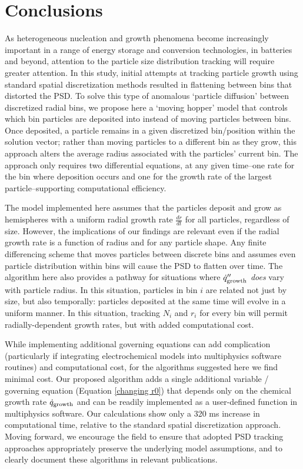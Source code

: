 \documentclass[final,3p,times,twocolumn, 12pt]{elsarticle}
\begin{document}
\section{Conclusions}
 As heterogeneous nucleation and growth phenomena become increasingly important in a range of energy storage and conversion technologies, in batteries and beyond, attention to the particle size distribution tracking will require greater attention. In this study, initial attempts at tracking particle growth using standard spatial discretization methods resulted in flattening between bins that distorted the PSD. To solve this type of anomalous `particle diffusion' between discretized radial bins, we propose here a `moving hopper' model that controls which bin particles are deposited into instead of moving particles between bins. Once deposited, a particle remains in a given discretized bin/position within the solution vector; rather than moving particles to a different bin as they grow, this approach alters the average radius associated with the particles' current bin. The approach only requires two differential equations, at any given time--one rate for the bin where deposition occurs and one for the growth rate of the largest particle--supporting computational efficiency.
 
 The model implemented here assumes that the particles deposit and grow as hemispheres with a uniform radial growth rate $\frac{dr}{dt}$ for all particles, regardless of size. However, the implications of our findings are relevant even if the radial growth rate is a function of radius and for any particle shape. Any finite differencing scheme that moves particles between discrete bins and assumes even particle distribution within bins will cause the PSD to flatten over time.  The algorithm here also provides a pathway for situations where $\dot{q}^{\prime\prime}_{\rm growth}$ \emph{does} vary with particle radius. In this situation, particles in bin $i$ are related not just by size, but also temporally: particles deposited at the same time will evolve in a uniform manner.  In this situation, tracking $N_i$ and $r_i$ for every bin will permit radially-dependent growth rates, but with added computational cost. 

While implementing additional governing equations can add complication (particularly if integrating electrochemical models into multiphysics software routines) and computational cost, for the algorithms suggested here we find minimal cost. Our proposed algorithm adds a single additional variable / governing equation (Equation \ref{changing r0}) that depends only on the chemical growth rate $\dot{q}_{\rm growth}$ and can be readily implemented as a user-defined function in multiphysics software. Our calculations show only a 320 ms increase in computational time, relative to the standard spatial discretization approach.  Moving forward, we encourage the field to ensure that adopted PSD tracking approaches appropriately preserve the underlying model assumptions, and to clearly document these algorithms in relevant publications.
\end{document}
